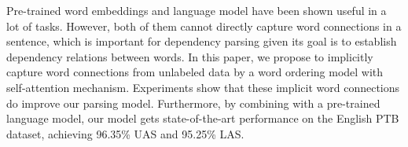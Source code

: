 Pre-trained word embeddings and language model have been shown useful in a lot of tasks. However, both of them cannot directly capture word connections in a sentence, which is important for dependency parsing given its goal is to establish dependency relations between words. In this paper, we propose to implicitly capture word connections from unlabeled data by a word ordering model with self-attention mechanism. Experiments show that these implicit word connections do improve our parsing model. Furthermore, by combining with a pre-trained language model, our model gets state-of-the-art performance on the English PTB dataset, achieving 96.35\% UAS and 95.25\% LAS.
